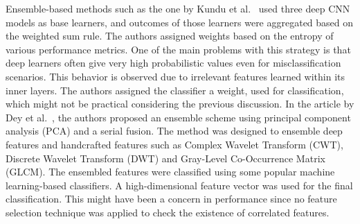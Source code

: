 \documentclass[final,3p,times]{elsarticle}
\begin{document}
Ensemble-based methods such as the one by Kundu et al.~\cite{kundu2021Pneumonia} used three deep CNN models as base learners, and outcomes of those learners were aggregated based on {the} weighted sum rule. The {authors assigned weights based on the} entropy of various performance metrics. One of the main problems with this strategy is that deep learners often give very high probabilistic values even for misclassification scenarios. {This behavior is observed due to} irrelevant features learned within its inner layers. The authors assigned the classifier a weight, used for classification, which might not be practical considering the previous discussion. In the article by Dey et al.~\cite{dey2021customized}, the authors proposed an ensemble scheme using principal component analysis (PCA) and a serial fusion. The method was designed to ensemble deep features and handcrafted features such as Complex Wavelet Transform (CWT), Discrete Wavelet Transform (DWT) and Gray-Level Co-Occurrence Matrix (GLCM). The {ensembled features were classified }using some popular machine learning-based classifiers. {A high-dimensional} feature vector was used for {the} final classification. This might have been a concern in performance since no feature selection technique was applied to check the existence of correlated features.
\end{document}
